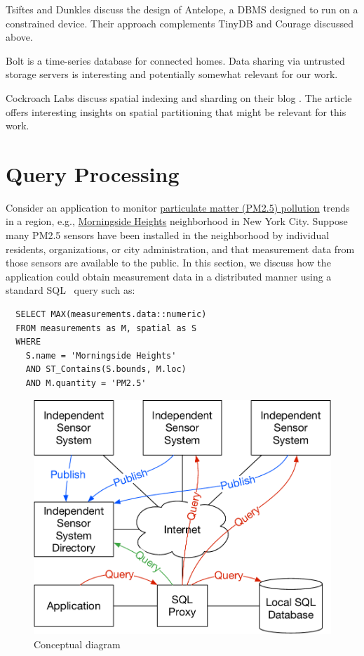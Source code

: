 \documentclass[conference,10pt]{IEEEtran}
\begin{document}
Tsiftes and Dunkles \cite{tsiftes11:sensordb} discuss the design of Antelope, a DBMS designed to run on a constrained device. Their approach complements TinyDB and Courage discussed above.

Bolt \cite{gupta14:bolt} is a time-series database for connected homes. Data sharing via untrusted storage servers is interesting and potentially somewhat relevant for our work.

Cockroach Labs discuss spatial indexing and sharding on their blog \cite{cockroach-spatial-indexing}. The article offers interesting insights on spatial partitioning that might be relevant for this work.

\section{Query Processing}
\label{sec:query-processing}

Consider an application to monitor \href{https://www.epa.gov/pm-pollution}{particulate matter (PM2.5) pollution} trends in a region, e.g., \href{https://www.openstreetmap.org/relation/8398079}{Morningside Heights} neighborhood in New York City. Suppose many PM2.5 sensors have been installed in the neighborhood by individual residents, organizations, or city administration, and that measurement data from those sensors are available to the public. In this section, we discuss how the application could obtain measurement data in a distributed manner using a standard SQL~\cite{sql} query such as:
\begin{verbatim}
  SELECT MAX(measurements.data::numeric)
  FROM measurements as M, spatial as S
  WHERE
    S.name = 'Morningside Heights'
    AND ST_Contains(S.bounds, M.loc)
    AND M.quantity = 'PM2.5'
\end{verbatim}

\begin{figure}
  \centering
  \includegraphics[width=0.8\linewidth]{figs/conceptual-diagram.pdf}
  \caption{Conceptual diagram}
  \label{fig:conceptual-diagram}
\end{figure}
\end{document}
